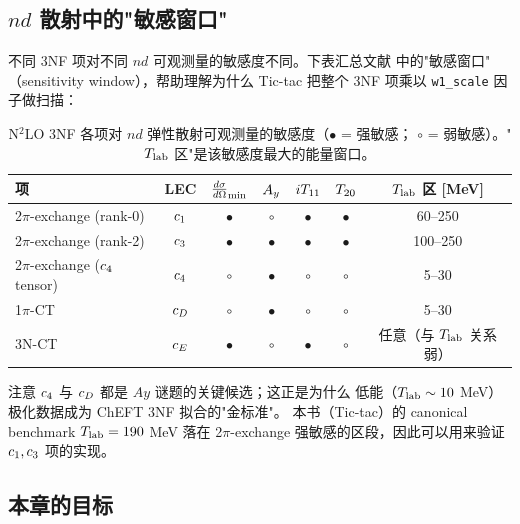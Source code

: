 \subsection{\(nd\) 散射中的"敏感窗口"}
\label{subsec:ch15-sensitivity-windows}

不同 3NF 项对不同 \(nd\) 可观测量的敏感度不同。下表汇总文献
\cite{Epelbaum2002NLO3NF, Witala1988, Miller2023PRC} 中的"敏感窗口"
（sensitivity window），帮助理解为什么 Tic-tac 把整个 3NF 项乘以
\texttt{w1\_scale} 因子做扫描：

\begin{table}[h]
\centering
\caption{N\(^2\)LO 3NF 各项对 \(nd\) 弹性散射可观测量的敏感度（\(\bullet\) = 强敏感；
\(\circ\) = 弱敏感）。"\({T_{\text{lab}}}\) 区"是该敏感度最大的能量窗口。}
\label{tab:ch15-sensitivity}
\begin{tabular}{l c c c c c c}
\toprule
项 & LEC & \(\frac{d\sigma}{d\Omega}_{\min}\) & \(A_y\) & \({i T_{11}}\) & \({T_{20}}\) & \({T_{\text{lab}}}\) 区 [MeV] \\
\midrule
2\(\pi\)-exchange (rank-0) & \(c_1\)        & \(\bullet\) & \(\circ\)   & \(\bullet\) & \(\bullet\) & 60--250 \\
2\(\pi\)-exchange (rank-2) & \(c_3\)      & \(\bullet\) & \(\bullet\) & \(\bullet\) & \(\bullet\) & 100--250 \\
2\(\pi\)-exchange (\(c_4\) tensor) & \(c_4\)  & \(\circ\)   & \(\bullet\) & \(\circ\)   & \(\circ\)   & 5--30 \\
1\(\pi\)-CT & \(c_D\)        & \(\circ\)   & \(\bullet\) & \(\circ\)   & \(\circ\)   & 5--30 \\
3N-CT  & \(c_E\)        & \(\bullet\) & \(\circ\)   & \(\bullet\) & \(\circ\)   & 任意（与 \({T_{\text{lab}}}\) 关系弱） \\
\bottomrule
\end{tabular}
\end{table}

注意 \(c_4\) 与 \(c_D\) 都是 \(Ay\) 谜题的关键候选；这正是为什么
低能（\({T_{\text{lab}}} \sim 10\) MeV）极化数据成为 ChEFT 3NF 拟合的"金标准"。
本书（Tic-tac）的 canonical benchmark \({T_{\text{lab}}} = 190\) MeV 落在 2\(\pi\)-exchange
强敏感的区段，因此可以用来验证 \(c_1, c_3\) 项的实现。

\subsection{本章的目标}
\label{subsec:ch15-goals}

